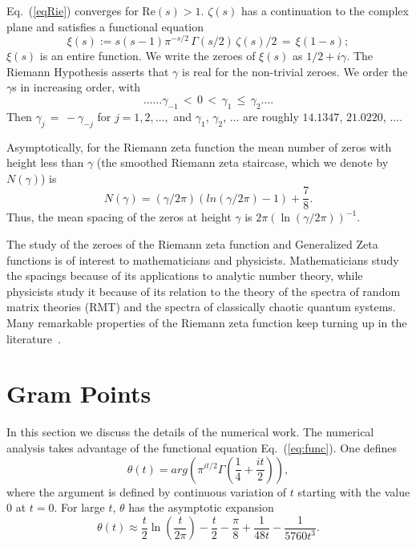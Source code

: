 \documentclass[twoside]{article}
\begin{document}
Eq.~(\ref{eqRie})  converges for $\mathrm{Re} (s) > 1$.  
 $\zeta ( s )$ has a  continuation
to the complex plane and satisfies a functional equation \cite{Riemann(1858),Riemann 1892, Titchmarsh 1986,Edwards(1974)}
\begin{equation}  
\xi(s):=s(s-1) \pi^{-s/2} \, \Gamma (s/2) \, \zeta ( s )/2 \, = \, \xi ( 1 - s );
\label{eq:xifunc}
\end{equation}
$\xi(s)$ is an entire function. We
write the zeroes of $\xi(s)$ as $1/2 + i \gamma$. The Riemann Hypothesis  
asserts that $\gamma$ is real for the non-trivial zeroes.
We order the $\gamma$s in increasing order, with 
\begin{equation}
\ldots \ldots \gamma_{-1} \, < \, 0 \, < \, 
\gamma_1 \, \leq \, \gamma_2 \ldots. 
\end{equation}
Then $\gamma_j \, = \, - \gamma_{-j}$ for $j = 1, 2, \ldots,$ 
and    $\gamma_1$, $\gamma_2$, $\ldots$  are roughly
$14.1347$, $21.0220$, $\ldots$.


Asymptotically, for the Riemann zeta function the mean number of 
zeros with height less than $\gamma$ (the smoothed Riemann zeta staircase, which we denote by $N(\gamma) $)
is~\cite{Edwards(1974)}
\begin{equation}  
N(\gamma) = (\gamma/2\pi)(ln(\gamma/2\pi)-1)+\frac{7}{8}.
\label{eq:Rnumber}
\end{equation}
Thus, the mean spacing of the zeros at height $\gamma$ is 
$2\pi(\ln (\gamma/2\pi))^{-1}$. 

The study of the zeroes of the Riemann zeta function and Generalized 
Zeta functions is of interest to mathematicians and physicists. Mathematicians 
study the spacings because of its applications to analytic number theory, 
while physicists study it because of its  relation 
to the theory of the spectra of random matrix theories (RMT) 
and the spectra of classically chaotic quantum systems. 
Many remarkable properties of the Riemann zeta function keep turning up in the literature~\cite{os6,Matiyasevich}.

\section{\label{sec3}Gram Points}

In this section we discuss the details of the numerical work. 
The numerical analysis takes advantage of the functional 
equation Eq.~(\ref{eq:func}).
One defines
\begin{equation}
\theta(t) = arg (\pi^{it/2} \Gamma(\frac{1}{4} + \frac{it}{2})), 
\label{eq:theta}
\end{equation}
where the argument is defined by continuous variation of $t$ starting with the value $0$ at $t = 0$.
For large $t$, $\theta$ has the asymptotic expansion
\begin{equation}
\theta(t) \approx \frac{t}{2}\ln (\frac{t}{2\pi}) - \frac{t}{2} - \frac{\pi}{8} + \frac{1}{48t} - \frac{1}{5760t^3}. 
\label{eq:thetaAsymptotic}
\end{equation}
\end{document}
